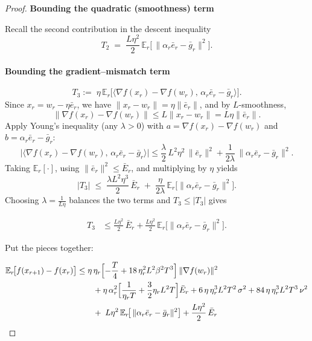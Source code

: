 \documentclass{article} %
\newcommand{\E}{\mathbb{E}}
\begin{document}
\begin{proof}
\textbf{Bounding the quadratic (smoothness) term}

Recall the second contribution in the descent inequality
\begin{equation}
T_{2}\;=\;\frac{L\eta^{2}}{2}\,
           \mathbb{E}_{r}\!\bigl[\,
               \|\alpha_{r}\bar e_{r}-\bar g_{r}\|^{2}
           \bigr].
\tag{8}
\label{P-T2}
\end{equation}

\paragraph{Bounding the gradient–mismatch term}
\[
T_{3}
:=\;
\eta\,
\E_{r}\!\bigl[
  \langle\nabla f(x_{r})-\nabla f(w_{r}),\,
          \alpha_{r}\bar e_{r}-\bar g_{r}\rangle
\bigr].
\]
Since $x_r = w_r - \eta \bar e_r$, we have $\|x_r-w_r\|=\eta\|\bar e_r\|$, and by $L$-smoothness,
\[
\|\nabla f(x_r)-\nabla f(w_r)\|\le L\|x_r-w_r\|=L\eta\|\bar e_r\|.
\]
Apply Young’s inequality (any $\lambda>0$) with
\(a=\nabla f(x_r)-\nabla f(w_r)\) and \(b=\alpha_r\bar e_r-\bar g_r\):
\[
\bigl|\langle\nabla f(x_r)-\nabla f(w_r),\,\alpha_r\bar e_r-\bar g_r\rangle\bigr|
\le
\frac{\lambda}{2}\,L^{2}\eta^{2}\,\|\bar e_r\|^2
+\frac{1}{2\lambda}\,\|\alpha_r\bar e_r-\bar g_r\|^2.
\]
Taking $\E_r[\cdot]$, using $\|\bar e_r\|^2\le \bar E_r$, and multiplying by $\eta$ yields
\[
|T_3|
\;\le\;
\frac{\lambda L^{2}\eta^{3}}{2}\,\bar E_r
\;+\;
\frac{\eta}{2\lambda}\,\E_r\!\bigl[\|\alpha_r\bar e_r-\bar g_r\|^2\bigr].
\]
Choosing $\displaystyle \lambda=\frac{1}{L\eta}$ balances the two terms and $T_3\le |T_3|$ gives

\begin{align}
T_3
&\le \frac{L\eta^2}{2}\,\bar E_r
   + \frac{L\eta^2}{2}\,\E_r\!\bigl[\|\alpha_r\bar e_r-\bar g_r\|^2\bigr].
\label{eq:T3}
\end{align}

Put the pieces together:

\begin{align}
\E_r\!\bigl[f(x_{r+1})-f(x_r)\bigr]
&\le \eta\,\eta_r\Bigl[
   -\frac{T}{4}
   + 18\,\eta_r^{2}L^{2}\beta^{2}T^{3}
\Bigr]\,
\|\nabla f(w_r)\|^{2} \notag\\
&\qquad
+ \eta\,\alpha_r^{2}\Bigl[\frac{1}{\eta_r T}+\frac{3}{2}\eta_r L^{2}T\Bigr]\bar E_r
+ 6\,\eta\,\eta_r^{3}L^{2}T^{2}\,\sigma^{2}
+ 84\,\eta\,\eta_r^{3}L^{2}T^{3}\,\nu^{2} \notag\\
&\qquad +\;L\eta^{2}\,
           \mathbb{E}_{r}\!\bigl[\,
               \|\alpha_{r}\bar e_{r}-\bar g_{r}\|^{2}
           \bigr] + \frac{L\eta^2}{2}\,\bar E_r
\end{align}


\end{proof}
\end{document}
